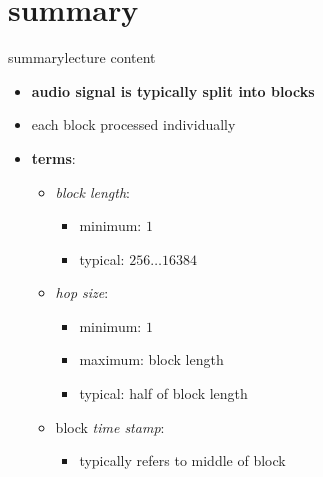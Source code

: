     \section{summary}
        \begin{frame}{summary}{lecture content}
            \begin{itemize}
                \item   \textbf{audio signal is typically split into blocks}
                \item   each block processed individually
                \smallskip
                \item   \textbf{terms}:
                    \begin{itemize}
                        \item   \textit{block length}:
                            \begin{itemize}
                                \item minimum: $1$
                                \item   typical: $256 \ldots 16384$
                            \end{itemize}
                        \item   \textit{hop size}:
                            \begin{itemize}
                                \item minimum: $1$
                                \item   maximum: block length
                                \item   typical: half of block length
                            \end{itemize}
                        \item   block \textit{time stamp}:
                            \begin{itemize}
                                \item typically refers to middle of block
                            \end{itemize}
                    \end{itemize}
            \end{itemize}
        \end{frame}

